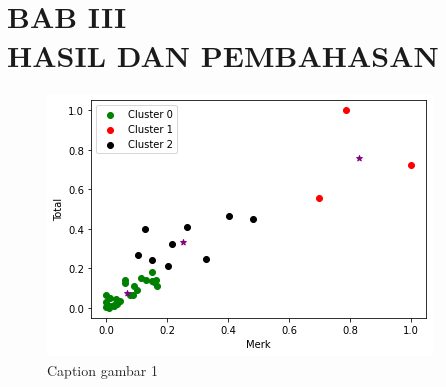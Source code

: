 \section*{\centering BAB III\\ HASIL DAN PEMBAHASAN}

\lipsum[1]

\begin{figure}[H]
    \centering
    \includegraphics[scale=.5]{Image/plot1.png}
    \caption{Caption gambar 1}
    \label{fig:my_label3}
\end{figure}

\lipsum[2]

\lipsum[3]

\lipsum[4]

